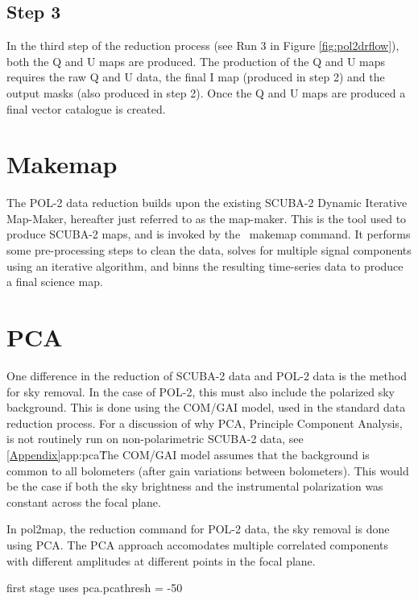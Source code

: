 \subsection*{Step 3}

In the third step of the reduction process (see Run 3 in Figure
\ref{fig:pol2drflow}), both the Q and U maps are produced. The production
of the Q and U maps requires the raw Q and U data, the final I map
(produced in step 2) and the output masks (also produced in step 2). Once
the Q and U maps are produced a final vector catalogue is created.

\section{Makemap}

The POL-2 data reduction builds upon the existing SCUBA-2 Dynamic Iterative
Map-Maker, hereafter just referred to as the map-maker. This is the tool used
to produce SCUBA-2 maps, and is invoked by
the \smurf\ makemap command. It performs some pre-processing steps to
clean the data, solves for multiple signal components using
an iterative algorithm, and binns the resulting time-series data to
produce a final science map.




\section{PCA}

One difference in the reduction of SCUBA-2 data and POL-2 data is the method for sky removal.
In the case of POL-2, this must also include the polarized sky background.
This is done using the COM/GAI model, used in the standard data reduction process.
For a discussion of why PCA, Principle Component Analysis, is not routinely run on non-polarimetric SCUBA-2 data, see \cref{Appendix}{app:pca}\.

The COM/GAI model assumes that the background is common to all bolometers (after gain variations between bolometers). This would be the case if both the sky brightness and the instrumental polarization was constant across the focal plane.

In pol2map, the reduction command for POL-2 data, the sky removal is done using PCA.
The PCA approach accomodates multiple correlated components with different amplitudes at different points in the focal plane.




first stage uses pca.pcathresh = -50

